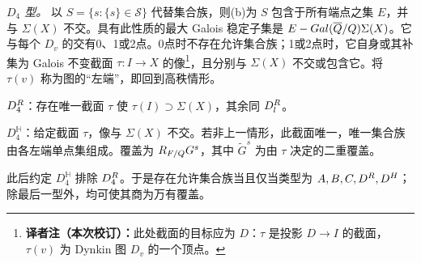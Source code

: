 \emph{$D_4$ 型。} 以 $S=\{s:\{s\}\in\mathcal S\}$ 代替集合族，则(b)为 $S$ 包含于所有端点之集 $E$，并与 $\Sigma(X)$ 不交。具有此性质的最大 Galois 稳定子集是 $E-Gal(\overline{Q}/Q)\Sigma(X)$。它与每个 $D_v$ 的交有0、1或2点。0点时不存在允许集合族；1或2点时，它自身或其补集为 Galois 不变截面 $\tau:I\to X$ 的像\footnote{\textbf{译者注（本次校订）：}此处截面的目标应为 $D$：$\tau$ 是投影 $D\to I$ 的截面，$\tau(v)$ 为 Dynkin 图 $D_v$ 的一个顶点。}，且分别与 $\Sigma(X)$ 不交或包含它。将 $\tau(v)$ 称为图的“左端”，即回到高秩情形。

$D_4^{R}$：存在唯一截面 $\tau$ 使 $\tau(I)\supset\Sigma(X)$，其余同 $D_l^{R}$。

$D_4^{\mathbb H}$：给定截面 $\tau$，像与 $\Sigma(X)$ 不交。若非上一情形，此截面唯一，唯一集合族由各左端单点集组成。覆盖为 $R_{F/Q}G^s$，其中 $\widetilde G^s$ 为由 $\tau$ 决定的二重覆盖。

此后约定 $D_4^{\mathbb H}$ 排除 $D_4^{R}$。于是存在允许集合族当且仅当类型为 $A,B,C,D^{R},D^{H}$；除最后一型外，均可使其商为万有覆盖。
